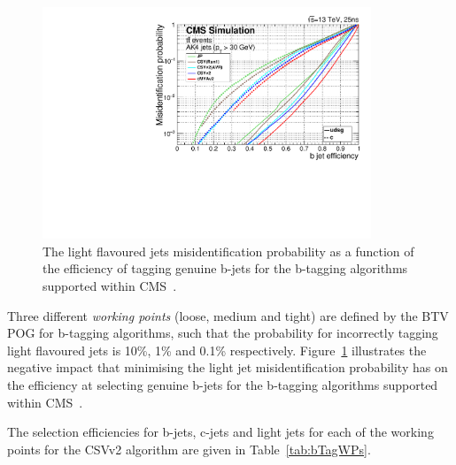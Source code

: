 \begin{figure}[htbp]
\centering
\includegraphics [width=0.875\textwidth]{figs/data-mc/effVsMisTagcsvV2.pdf}
\caption{The light flavoured jets misidentification probability as a function of the efficiency of tagging genuine b-jets for the b-tagging algorithms supported within CMS~\cite{Sirunyan:2017ezt}.}
\label{fig:bTagEffVsMisId}
\end{figure}

Three different \emph{working points} (loose, medium and tight) are defined by the BTV POG for b-tagging algorithms, such that the probability for incorrectly tagging light flavoured jets is 10\%, 1\% and 0.1\% respectively.
Figure~\ref{fig:bTagEffVsMisId} illustrates the negative impact that minimising the light jet misidentification probability has on the efficiency at selecting genuine b-jets for the b-tagging algorithms supported within CMS~\cite{Sirunyan:2017ezt}.

The selection efficiencies for b-jets, c-jets and light jets for each of the working points for the CSVv2 algorithm are given in Table~\ref{tab:bTagWPs}.

